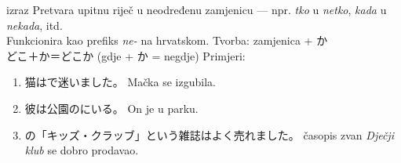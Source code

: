 \documentclass[10pt, utf8, border=0.4cm]{standalone}
\begin{document}
	\pagecolor{maroon}
	\color{fuchsia}
	\centering
	\parbox{10cm}{
		 \hfill izraz \br
		Pretvara upitnu riječ u neodređenu zamjenicu --- npr. \textit{tko} u \textit{netko},  \textit{kada} u \textit{nekada}, itd. \\
		Funkcionira kao prefiks \textit{ne-} na hrvatskom. \br
		Tvorba: zamjenica + か \\
		どこ＋か＝どこか \hfill (gdje + か = negdje) \br
		Primjeri:
		\begin{enumerate}
			\item 猫はで迷いました。\bh
			Mačka se  izgubila.
			\item 彼は公園のにいる。\bh
			On je  u parku.
			\item {}の「キッズ・クラッブ」という雑誌はよく売れました。\bh
			 časopis zvan \textit{Dječji klub} se dobro prodavao.
		\end{enumerate}
	}
\end{document}
